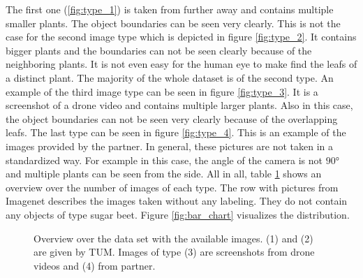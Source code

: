 The first one (\ref{fig:type_1}) is taken from further away and contains multiple smaller plants. The object boundaries can be seen very clearly. This is not the case for the second image type which is depicted in figure \ref{fig:type_2}. It contains bigger plants and the boundaries can not be seen clearly because of the neighboring plants. It is not even easy for the human eye to make find the leafs of a distinct plant. The majority of the whole dataset is of the second type. An example of the third image type can be seen in figure \ref{fig:type_3}. It is a screenshot of a drone video and contains multiple larger plants. Also in this case, the object boundaries can not be seen very clearly because of the overlapping leafs. The last type can be seen in figure \ref{fig:type_4}. This is an example of the images provided by the partner. In general, these pictures are not taken in a standardized way. For example in this case, the angle of the camera is not $ 90° $ and multiple plants can be seen from the side. All in all, table \ref{tab:dataset} shows an overview over the number of images of each type. The row with pictures from Imagenet describes the images taken without any labeling. They do not contain any objects of type sugar beet. Figure \ref{fig:bar_chart} visualizes the distribution. \\

\begin{figure}
	\centering
{}
\caption{Overview over the data set with the available images. (1) and (2) are given by TUM. Images of type (3) are screenshots from drone videos and (4) from partner.}
\label{tab:dataset}
\end{figure}

